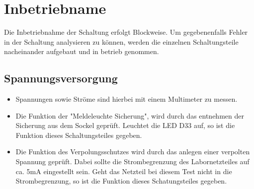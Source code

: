 \documentclass[a4paper,11pt]{scrartcl}
\begin{document}
\section{Inbetriebname}


\begin{center}
Die Inbetriebnahme der Schaltung erfolgt Blockweise. Um gegebenenfalls Fehler in der Schaltung analysieren zu 	 können, werden die einzelnen Schaltungsteile nacheinander aufgebaut und in betrieb genommen.
\end{center}



\subsection{Spannungsversorgung}


\begin{itemize}
	\item{Spannungen sowie Ströme sind hierbei mit einem Multimeter zu messen.}
	
	\item{Die Funktion der "Meldeleuchte Sicherung", wird durch das entnehmen der Sicherung aus dem Sockel geprüft. Leuchtet die LED D33 auf, so ist die Funktion dieses Schaltungsteiles gegeben.}
	
	\item{Die Funktion des Verpolungsschutzes wird durch das anlegen einer verpolten Spannung geprüft. Dabei sollte die Strombegrenzung des Labornetzteiles auf ca. 5mA eingestellt sein. Geht das Netzteil bei diesem Test nicht in die Strombegrenzung, so ist die Funktion dieses Schatungsteiles gegeben.}
\end{itemize}

\end{document}
